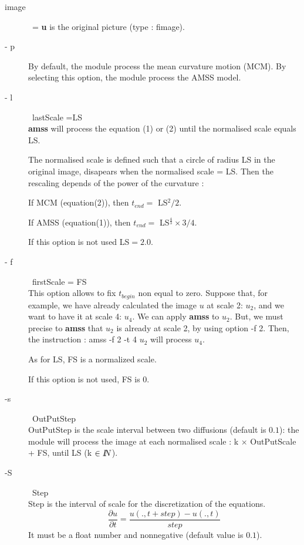 \begin{description}

\item[ image] \ = {\bf u } is the original picture (type : fimage).

\item[- p] 

By default, the module process the mean curvature motion (MCM). 
By selecting this option, the module process the AMSS model.

\item[- l] \ lastScale =LS \\
{\bf amss} will process the equation (1) or (2) until the normalised scale equals LS.

The normalised scale is defined such
 that a circle of radius LS in the original image, 
disapears when the normalised scale = LS.
Then the rescaling depends of the power of the curvature :

If MCM (equation(2)), then $t_{end} = $ LS$^2 / 2$.

If AMSS (equation(1)), then $t_{end} = $ LS$^\frac{4}{3} \times 3 /4$.

If this option is not used LS$=2.0$.

\item[- f] \ firstScale = FS \\
This option allows to fix $t_{begin}$ non equal to zero. Suppose that, for example,
we have already calculated the image $u$ at scale 2: $u_2$, and we want to have 
it at scale 4: $u_4$.
We can apply {\bf amss} to $u_2$. But, we must precise to {\bf amss} that $u_2$ 
is already at scale 2, by using option
-f 2. Then, the instruction : amss -f 2 -t 4 $u_2$ will process $u_4$.

As for LS, FS is a normalized scale.

If this option is not used, FS is 0.

\item[ -s] \ OutPutStep \\

OutPutStep is the scale interval between two diffusions (default is $0.1$):
the module will process the image at each normalised scale : 
k $\times$ OutPutScale + FS, until LS (k $\in I\!\!N$).

\item[ -S] \ Step \\
 Step is the interval of scale for the discretization of the equations.
$$\frac{\partial u}{\partial t} = \frac{u(.,t+step) - u(.,t)}{step} $$
It must be a float number and nonnegative (default value is $0.1$).


\end{description}
